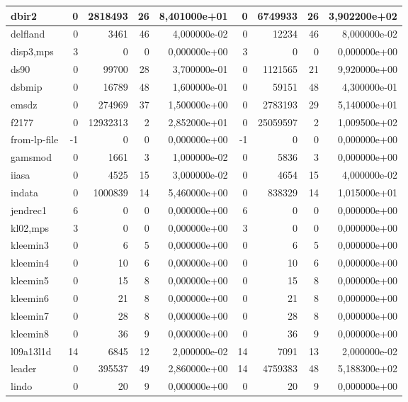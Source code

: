 \begin{tabular}{|l|r|r|r|r|r|r|r|r|}
dbir2 & 0 & 2818493 & 26 & 8,401000e+01 & 0 & 6749933 & 26 & 3,902200e+02 \\ \hline
delfland & 0 & 3461 & 46 & 4,000000e-02 & 0 & 12234 & 46 & 8,000000e-02 \\ \hline
disp3,mps & 3 & 0 & 0 & 0,000000e+00 & 3 & 0 & 0 & 0,000000e+00 \\ \hline
ds90 & 0 & 99700 & 28 & 3,700000e-01 & 0 & 1121565 & 21 & 9,920000e+00 \\ \hline
dsbmip & 0 & 16789 & 48 & 1,600000e-01 & 0 & 59151 & 48 & 4,300000e-01 \\ \hline
emsdz & 0 & 274969 & 37 & 1,500000e+00 & 0 & 2783193 & 29 & 5,140000e+01 \\ \hline
f2177 & 0 & 12932313 & 2 & 2,852000e+01 & 0 & 25059597 & 2 & 1,009500e+02 \\ \hline
from-lp-file & -1 & 0 & 0 & 0,000000e+00 & -1 & 0 & 0 & 0,000000e+00 \\ \hline
gamsmod & 0 & 1661 & 3 & 1,000000e-02 & 0 & 5836 & 3 & 0,000000e+00 \\ \hline
iiasa & 0 & 4525 & 15 & 3,000000e-02 & 0 & 4654 & 15 & 4,000000e-02 \\ \hline
indata & 0 & 1000839 & 14 & 5,460000e+00 & 0 & 838329 & 14 & 1,015000e+01 \\ \hline
jendrec1 & 6 & 0 & 0 & 0,000000e+00 & 6 & 0 & 0 & 0,000000e+00 \\ \hline
kl02,mps & 3 & 0 & 0 & 0,000000e+00 & 3 & 0 & 0 & 0,000000e+00 \\ \hline
kleemin3 & 0 & 6 & 5 & 0,000000e+00 & 0 & 6 & 5 & 0,000000e+00 \\ \hline
kleemin4 & 0 & 10 & 6 & 0,000000e+00 & 0 & 10 & 6 & 0,000000e+00 \\ \hline
kleemin5 & 0 & 15 & 8 & 0,000000e+00 & 0 & 15 & 8 & 0,000000e+00 \\ \hline
kleemin6 & 0 & 21 & 8 & 0,000000e+00 & 0 & 21 & 8 & 0,000000e+00 \\ \hline
kleemin7 & 0 & 28 & 8 & 0,000000e+00 & 0 & 28 & 8 & 0,000000e+00 \\ \hline
kleemin8 & 0 & 36 & 9 & 0,000000e+00 & 0 & 36 & 9 & 0,000000e+00 \\ \hline
l09a13l1d & 14 & 6845 & 12 & 2,000000e-02 & 14 & 7091 & 13 & 2,000000e-02 \\ \hline
leader & 0 & 395537 & 49 & 2,860000e+00 & 14 & 4759383 & 48 & 5,188300e+02 \\ \hline
lindo & 0 & 20 & 9 & 0,000000e+00 & 0 & 20 & 9 & 0,000000e+00 \\ \hline

\end{tabular}
